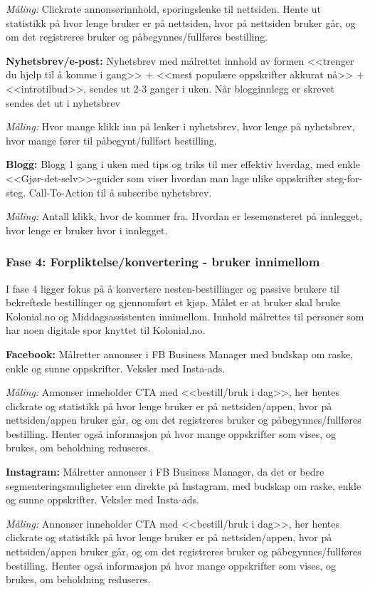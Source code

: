 \textit{Måling:} Clickrate annonsørinnhold, sporingslenke til nettsiden. Hente ut statistikk på hvor lenge bruker er på nettsiden, hvor på nettsiden bruker går, og om det registreres bruker og påbegynnes/fullføres bestilling. 

\textbf{Nyhetsbrev/e-post:} Nyhetsbrev med målrettet innhold av formen <<trenger du hjelp til å komme i gang>> + <<mest populære oppskrifter akkurat nå>> + <<introtilbud>>, sendes ut 2-3 ganger i uken. 
Når blogginnlegg er skrevet sendes det ut i nyhetsbrev

\textit{Måling:} Hvor mange klikk inn på lenker i nyhetsbrev, hvor lenge på nyhetsbrev, hvor mange fører til påbegynt/fullført bestilling. 

\textbf{Blogg:} Blogg 1 gang i uken med tips og triks til mer effektiv hverdag, med enkle <<Gjør-det-selv>>-guider som viser hvordan man lage ulike oppskrifter steg-for-steg. Call-To-Action til å subscribe nyhetsbrev.

\textit{Måling:} Antall klikk, hvor de kommer fra. Hvordan er lesemønsteret på innlegget, hvor lenge er bruker hvor i innlegget. 

\subsubsection{\textbf{Fase 4: Forpliktelse/konvertering - bruker innimellom}}
I fase 4 ligger fokus på å konvertere nesten-bestillinger og passive brukere til bekreftede bestillinger og gjennomført et kjøp. Målet er at bruker skal bruke Kolonial.no og Middagsassistenten innimellom. Innhold målrettes til personer som har noen digitale spor knyttet til Kolonial.no. 

\textbf{Facebook:} Målretter annonser i FB Business Manager med budskap om raske, enkle og sunne oppskrifter. Veksler med Insta-ads. 

\textit{Måling:} Annonser inneholder CTA med <<bestill/bruk i dag>>, her hentes clickrate og statistikk på hvor lenge bruker er på nettsiden/appen, hvor på nettsiden/appen bruker går, og om det registreres bruker og påbegynnes/fullføres bestilling. Henter også informasjon på hvor mange oppskrifter som vises, og brukes, om beholdning reduseres.  

\textbf{Instagram:} Målretter annonser i FB Business Manager, da det er bedre segmenteringsmuligheter enn direkte på Instagram, med budskap om raske, enkle og sunne oppskrifter. Veksler med Insta-ads. 

\textit{Måling:} Annonser inneholder CTA med <<bestill/bruk i dag>>, her hentes clickrate og statistikk på hvor lenge bruker er på nettsiden/appen, hvor på nettsiden/appen bruker går, og om det registreres bruker og påbegynnes/fullføres bestilling. Henter også informasjon på hvor mange oppskrifter som vises, og brukes, om beholdning reduseres.  

